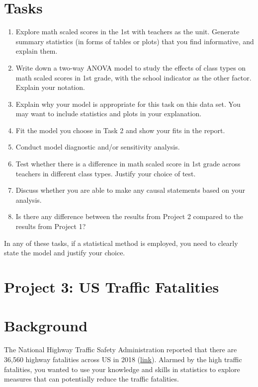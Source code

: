 \documentclass[12pt,]{book}
\begin{document}
\section{Tasks}\label{tasks-1}

\begin{enumerate}
\def\labelenumi{\arabic{enumi}.}
\item
  Explore math scaled scores in the 1st with teachers as the unit.
  Generate summary statistics (in forms of tables or plots) that you
  find informative, and explain them.
\item
  Write down a two-way ANOVA model to study the effects of class types
  on math scaled scores in 1st grade, with the school indicator as the
  other factor. Explain your notation.
\item
  Explain why your model is appropriate for this task on this data set.
  You may want to include statistics and plots in your explanation.
\item
  Fit the model you choose in Task 2 and show your fits in the report.
\item
  Conduct model diagnostic and/or sensitivity analysis.
\item
  Test whether there is a difference in math scaled score in 1st grade
  across teachers in different class types. Justify your choice of test.
\item
  Discuss whether you are able to make any causal statements based on
  your analysis.
\item
  Is there any difference between the results from Project 2 compared to
  the results from Project 1?
\end{enumerate}

In any of these tasks, if a statistical method is employed, you need to
clearly state the model and justify your choice.

\section{Project 3: US Traffic
Fatalities}\label{project-3-us-traffic-fatalities}

\section{Background}\label{background-2}

The National Highway Traffic Safety Administration reported that there
are 36,560 highway fatalities across US in 2018
(\href{nhtsa.gov/press-releases/roadway-fatalities-2018-fars}{link}).
Alarmed by the high traffic fatalities, you wanted to use your knowledge
and skills in statistics to explore measures that can potentially reduce
the traffic fatalities.
\end{document}
